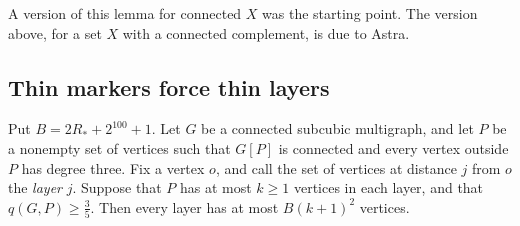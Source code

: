 A version of this lemma for connected $X$ was the starting point. The version above, for a set $X$
with a connected complement, is due to Astra.

\subsection{Thin markers force thin layers}

\begin{lemma}[Layers]\label{lem:width}
Put $B=2R_{*}+2^{100}+1$. Let $G$ be a connected subcubic multigraph, and let $P$ be a nonempty set
of vertices such that $G[P]$ is connected and every vertex outside $P$ has degree three. Fix a
vertex $o$, and call the set of vertices at distance $j$ from $o$ the \emph{layer} $j$. Suppose that
$P$ has at most $k\ge1$ vertices in each layer, and that $q(G,P)\ge\frac35$. Then every layer has at
most $B(k+1)^{2}$ vertices.
\end{lemma}

